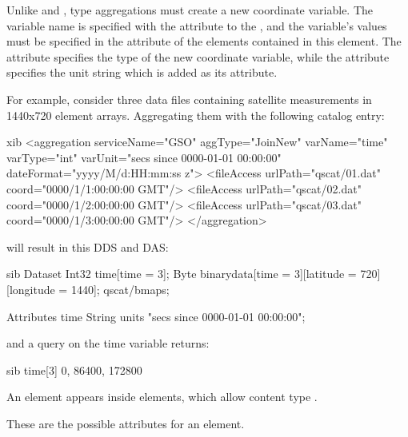 Unlike  and ,  type
aggregations must create a new coordinate variable. The variable name
is specified with the  attribute to the
, and the variable's values must be specified in the
 attribute of the  elements contained in
this  element.  The  attribute specifies
the type of the new coordinate variable, while the 
attribute specifies the unit string which is added as its attribute.

For example, consider three data files containing satellite
measurements in 1440x720 element arrays.  Aggregating them with the
following catalog entry:

\begin{vcode}{xib}
<aggregation serviceName="GSO" aggType="JoinNew" varName="time" 
    varType="int" varUnit="secs since 0000-01-01 00:00:00" 
    dateFormat="yyyy/M/d:HH:mm:ss z">
  <fileAccess urlPath="qscat/01.dat" coord="0000/1/1:00:00:00 GMT"/>
  <fileAccess urlPath="qscat/02.dat" coord="0000/1/2:00:00:00 GMT"/>
  <fileAccess urlPath="qscat/03.dat" coord="0000/1/3:00:00:00 GMT"/>
</aggregation>
\end{vcode}

will result in this DDS and DAS:

\begin{vcode}{sib}
Dataset {
  Int32 time[time = 3];
  Byte binarydata[time = 3][latitude = 720][longitude = 1440];
} qscat/bmaps;

Attributes {
  time {
    String units "secs since 0000-01-01 00:00:00";
  }
}
\end{vcode}


and a query on the time variable returns:

\begin{vcode}{sib}
time[3]
0, 86400, 172800
\end{vcode}

An  element appears inside 
elements, which allow content type .

These are the possible attributes for an  element.


